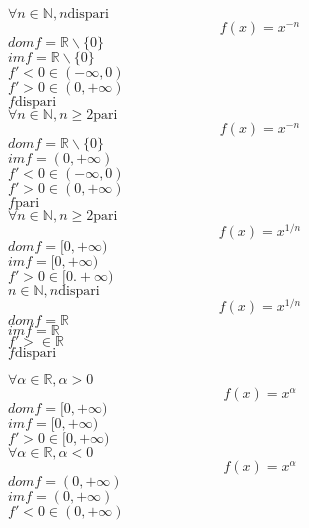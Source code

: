 \documentclass[a4paper,12pt]{article}
\theoremstyle{mystyle}
\begin{document}
\(\forall n \in \mathbb N, n \text{dispari}\)\\
\begin{equation}
    f(x)=x^{-n}
\end{equation}
\(dom f= \mathbb R\backslash \{0\}\)\\
\(im f = \mathbb R \backslash \{0\}\)\\
\(f'<0 \in (-\infty,0)\)\\
\(f'>0 \in (0, + \infty)\)\\
\(f \text{dispari}\)\\

\(\forall n \in \mathbb N, n \geq 2 \text{pari}\)\\
\begin{equation}
    f(x) = x^{-n}
\end{equation}
\(dom f = \mathbb R \backslash \{0\}\)\\
\(im f = (0, + \infty)\)\\
\(f'<0 \in (-\infty,0)\)\\
\(f'>0 \in (0,+\infty)\)\\
\(f \text{pari}\)\\

\(\forall n \in \mathbb N, n \geq 2 \text{pari}\)\\
\begin{equation}
    f(x)=x^{1/n}
\end{equation}
\(dom f= [0, + \infty)\)\\
\(im f = [0,+\infty)\)\\
\(f'>0 \in [0. + \infty)\)\\

\(n \in \mathbb N, n \text{dispari}\)\\
\begin{equation}
    f(x)= x^{1/n}
\end{equation}
\(dom f= \mathbb R\)\\
\(im f = \mathbb R\)\\
\(f'> \in \mathbb R\)\\
\(f \text{dispari}\)

\(\forall \alpha \in \mathbb R, \alpha >0\)
\begin{equation}
    f(x)=x^\alpha
\end{equation}
\(dom f= [0, + \infty)\)\\
\(im f = [0, + \infty)\)\\
\(f'> 0 \in [0, + \infty)\)\\

\(\forall \alpha \in \mathbb R, \alpha < 0\)\\
\begin{equation}
    f(x)=x^\alpha
\end{equation}
\(dom f=(0, + \infty)\)\\
\(im f = (0, + \infty)\)\\
\(f' < 0 \in (0, + \infty)\)
\end{document}
